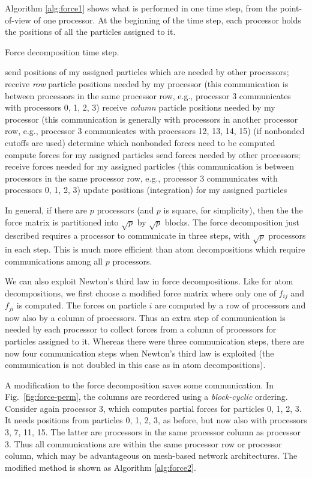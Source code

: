 Algorithm \ref{alg:force1} shows what is performed in one time step,
from the point-of-view of one processor.
At the beginning of the time step, each processor
holds the positions of all the particles assigned to it.
\begin{algorithm}
\caption{Force decomposition time step.}
\label{alg:force1}
\begin{algorithmic}[1]
\STATE send positions of my assigned particles which are needed by
other processors; receive {\em row} particle positions needed by my processor
(this communication is between processors in the same processor row, e.g., processor
3 communicates with processors 0, 1, 2, 3)
\STATE receive {\em column} particle positions needed by my processor
(this communication is generally with processors in another processor row, e.g.,
processor 3 communicates with processors 12, 13, 14, 15)
\STATE (if nonbonded cutoffs are used) determine which nonbonded forces need to be computed
\STATE compute forces for my assigned particles
\STATE send forces needed by other processors; receive forces needed for my
assigned particles (this communication is between processors in the same 
processor row, e.g., processor 3 communicates with processors 0, 1, 2, 3)
\STATE update positions (integration) for my assigned particles
\end{algorithmic}
\end{algorithm}

In general, if there are $p$ processors (and $p$ is square, for simplicity),
then the the force matrix is partitioned into $\sqrt{p}$ by $\sqrt{p}$ blocks.
The force decomposition just described requires a processor to communicate
in three steps, with $\sqrt{p}$ processors in each step.  This is much 
more efficient than atom decompositions which require communications among all
$p$ processors.

We can also exploit Newton's third law in force decompositions.
Like for atom decompositions, we first choose a modified force matrix
where only one of $f_{ij}$ and $f_{ji}$ is computed.  The forces
on particle $i$ are computed by a row of processors and now also by
a column of processors.  Thus an extra step of communication is needed
by each processor to collect forces from a column of processors
for particles assigned to it.  
Whereas there were three
communication steps, there are now four communication steps when
Newton's third law is exploited (the communication is not doubled
in this case as in atom decompositions).

A modification to the force decomposition saves some communication.
In Fig.~\ref{fig:force-perm}, the columns are reordered using a 
{\em block-cyclic} ordering.  Consider again processor 3, which computes
partial forces for particles 0, 1, 2, 3.  It needs positions from
particles 0, 1, 2, 3, as before, but now also with processors 3, 7,
11, 15.  The latter are processors in the same processor column as
processor 3.  Thus all communications are within the same processor row
or processor column, which may be advantageous on mesh-based network
architectures.  The modified method is shown as
Algorithm \ref{alg:force2}.

